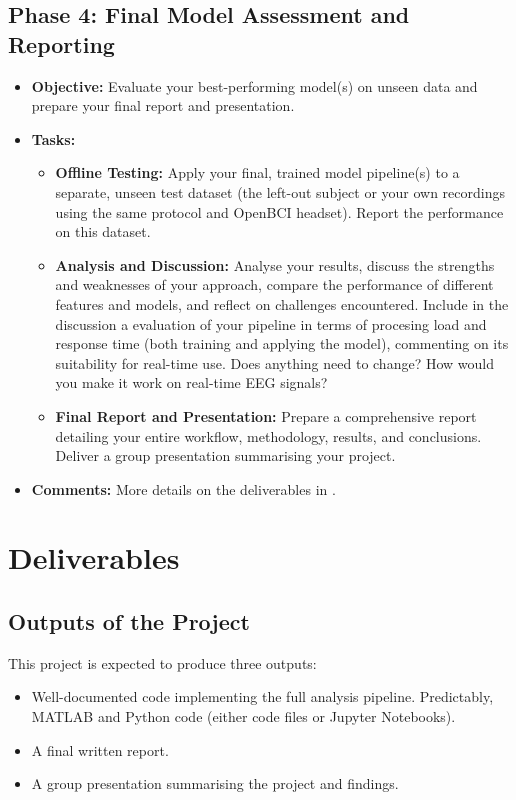 \documentclass[11pt]{exam}
\begin{document}
    \subsection{Phase 4: Final Model Assessment and Reporting}
    \begin{itemize}
        \item \textbf{Objective:} Evaluate your best-performing model(s) on unseen data and prepare your final report and presentation.
        \item \textbf{Tasks:}
        \begin{itemize}
            \item \textbf{Offline Testing:} Apply your final, trained model pipeline(s) to a separate, unseen test dataset (the left-out subject or your own recordings using the same protocol and OpenBCI headset). Report the performance on this dataset.
            \item \textbf{Analysis and Discussion:} Analyse your results, discuss the strengths and weaknesses of your approach, compare the performance of different features and models, and reflect on challenges encountered. Include in the discussion a evaluation of your pipeline in terms of procesing load and response time (both training and applying the model), commenting on its suitability for real-time use. Does anything need to change? How would you make it work on real-time EEG signals?
            \item \textbf{Final Report and Presentation:} Prepare a comprehensive report detailing your entire workflow, methodology, results, and conclusions. Deliver a group presentation summarising your project.
        \end{itemize}
        \item \textbf{Comments:} More details on the deliverables in .
    \end{itemize}

    \newpage
    \section{Deliverables}
    \label{sec:deliverables}

    \subsection{Outputs of the Project}
    This project is expected to produce three outputs:
    \begin{itemize}
        \item Well-documented code implementing the full analysis pipeline. Predictably, MATLAB and Python code (either code files or Jupyter Notebooks).
        \item A final written report.
        \item A group presentation summarising the project and findings. %
    \end{itemize}
\end{document}
